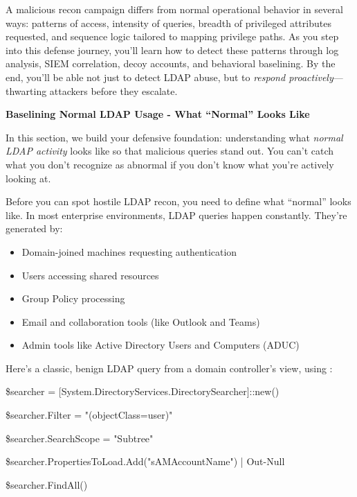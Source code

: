 {{A malicious recon campaign differs from normal operational behavior in several ways: patterns of access, intensity of queries, breadth of privileged attributes requested, and sequence logic tailored to mapping privilege paths. As you step into this defense journey, you’ll learn how to detect these patterns through log analysis, SIEM correlation, decoy accounts, and behavioral baselining. By the end, you’ll be able not just to detect LDAP abuse, but to \textit{respond proactively}—thwarting attackers before they escalate.

\textbf{Baselining Normal LDAP Usage - What “Normal” Looks Like}

In this section, we build your defensive foundation: understanding what \textit{normal LDAP activity }looks like so that malicious queries stand out. You can’t catch what you don’t recognize as abnormal if you don’t know what you’re actively looking at.

Before you can spot hostile LDAP recon, you need to define what “normal” looks like. In most enterprise environments, LDAP queries happen constantly. They’re generated by:

\begin{itemize}
    \item Domain-joined machines requesting authentication

    \item Users accessing shared resources

    \item Group Policy processing

    \item Email and collaboration tools (like Outlook and Teams)

    \item Admin tools like Active Directory Users and Computers (ADUC)

\end{itemize}
Here’s a classic, benign LDAP query from a domain controller’s view, using  :

 

 

\$searcher = [System.DirectoryServices.DirectorySearcher]::new()

\$searcher.Filter = "(objectClass=user)"

\$searcher.SearchScope = "Subtree"

\$searcher.PropertiesToLoad.Add("sAMAccountName") | Out-Null

\$searcher.FindAll()

}}
